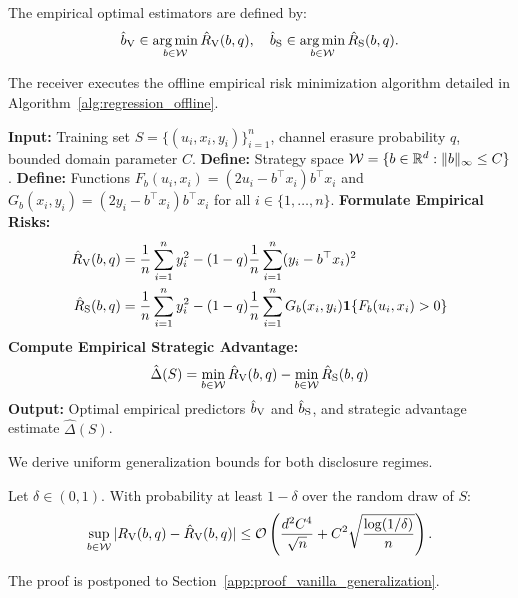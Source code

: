 The empirical optimal estimators are defined by:
\begin{equation}
    \label{eq:empirical_estimators}
    \hat{b}_{\mathrm{V}} \in \operatorname*{arg\,min}_{b \in \mathcal{W}} \hat{R}_{\mathrm{V}}(b, q), \quad \hat{b}_{\mathrm{S}} \in \operatorname*{arg\,min}_{b \in \mathcal{W}} \hat{R}_{\mathrm{S}}(b, q).
\end{equation}

The receiver executes the offline empirical risk minimization algorithm detailed in Algorithm~\ref{alg:regression_offline}.

\begin{algorithm}[htbp]
\caption{Strategic Regression Empirical Risk Minimization (SR-ERM)}
\label{alg:regression_offline}
\begin{algorithmic}[1]
\State \textbf{Input:} Training set $S = \{(u_i, x_i, y_i)\}_{i=1}^n$, channel erasure probability $q$, bounded domain parameter $C$.
\State \textbf{Define:} Strategy space $\mathcal{W} = \{b \in \mathbb{R}^d : \|b\|_\infty \le C\}$.
\State \textbf{Define:} Functions $F_b(u_i, x_i) = (2u_i - b^\top x_i)b^\top x_i$ and $G_b(x_i, y_i) = (2y_i - b^\top x_i)b^\top x_i$ for all $i \in \{1,\dots,n\}$.
\State \textbf{Formulate Empirical Risks:}
\begin{align*}
    \hat{R}_{\mathrm{V}}(b, q) &= \frac{1}{n}\sum_{i=1}^n y_i^2 - (1 - q)\frac{1}{n}\sum_{i=1}^n (y_i - b^\top x_i)^2 \\
    \hat{R}_{\mathrm{S}}(b, q) &= \frac{1}{n}\sum_{i=1}^n y_i^2 - (1 - q)\frac{1}{n}\sum_{i=1}^n G_b(x_i, y_i) \mathbf{1}\{F_b(u_i, x_i) > 0\}
\end{align*}
\State \textbf{Compute Empirical Strategic Advantage:}
\begin{equation*}
    \hat{\Delta}(S) = \min_{b \in \mathcal{W}} \hat{R}_{\mathrm{V}}(b, q) - \min_{b \in \mathcal{W}} \hat{R}_{\mathrm{S}}(b, q)
\end{equation*}
\State \textbf{Output:} Optimal empirical predictors $\hat{b}_{\mathrm{V}}$ and $\hat{b}_{\mathrm{S}}$, and strategic advantage estimate $\hat{\Delta}(S)$.
\end{algorithmic}
\end{algorithm}

We derive uniform generalization bounds for both disclosure regimes.
\begin{lemma}
\label{lem:vanilla_generalization}
Let $\delta \in (0, 1)$. With probability at least $1 - \delta$ over the random draw of $S$:
\begin{equation}
    \label{eq:vanilla_gen_bound}
    \sup_{b \in \mathcal{W}} |R_{\mathrm{V}}(b, q) - \hat{R}_{\mathrm{V}}(b, q)| \le \mathcal{O}\left( \frac{d^2 C^4}{\sqrt{n}} + C^2 \sqrt{\frac{\log(1/\delta)}{n}} \right).
\end{equation}
\end{lemma}
The proof is postponed to Section~\ref{app:proof_vanilla_generalization}.


